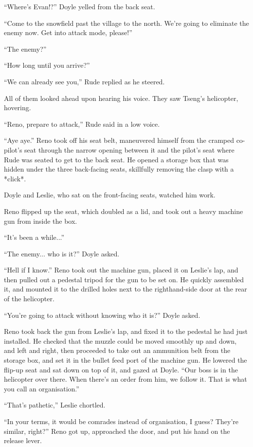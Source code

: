 \documentclass[oneside]{book}
\begin{document}
“Where’s Evan!?” Doyle yelled from the back seat.

“Come to the snowfield past the village to the north. We’re going to eliminate the enemy now. Get into attack mode, please!”

“The enemy?”

“How long until you arrive?”

“We can already see you,” Rude replied as he steered.

All of them looked ahead upon hearing his voice. They saw Tseng’s helicopter, hovering.

“Reno, prepare to attack,” Rude said in a low voice.

“Aye aye.” Reno took off his seat belt, maneuvered himself from the cramped co-pilot’s seat through the narrow opening between it and the pilot’s seat where Rude was seated to get to the back seat. He opened a storage box that was hidden under the three back-facing seats, skillfully removing the clasp with a *click*.

Doyle and Leslie, who sat on the front-facing seats, watched him work.

Reno flipped up the seat, which doubled as a lid, and took out a heavy machine gun from inside the box.

“It’s been a while...”

“The enemy... who is it?” Doyle asked.

“Hell if I know.” Reno took out the machine gun, placed it on Leslie’s lap, and then pulled out a pedestal tripod for the gun to be set on. He quickly assembled it, and mounted it to the drilled holes next to the righthand-side door at the rear of the helicopter.

“You’re going to attack without knowing who it is?” Doyle asked.

Reno took back the gun from Leslie’s lap, and fixed it to the pedestal he had just installed. He checked that the muzzle could be moved smoothly up and down, and left and right, then proceeded to take out an ammunition belt from the storage box, and set it in the bullet feed port of the machine gun. He lowered the flip-up seat and sat down on top of it, and gazed at Doyle. “Our boss is in the helicopter over there. When there’s an order from him, we follow it. That is what you call an organisation.”

“That’s pathetic,” Leslie chortled.

“In your terms, it would be comrades instead of organisation, I guess? They’re similar, right?” Reno got up, approached the door, and put his hand on the release lever.
\end{document}
